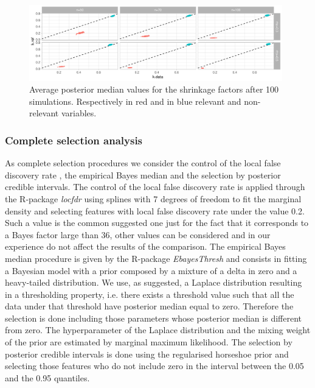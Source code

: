 \documentclass[american,]{article}
\theoremstyle{definition}
\begin{document}
\begin{figure}[tp]
  \centering
  \includegraphics[width=0.98\textwidth]{graphics/k.pdf}
  \caption{Average posterior median values for the shrinkage factors after 100 simulations. Respectively in red and in blue relevant and non-relevant variables.\\}
  \label{fig:k}
\end{figure}


\hypertarget{complete-selection}{%
\subsubsection{Complete selection analysis}\label{complete-selection}}
As complete selection procedures we consider the control of the local false discovery rate \citep{paper:efron, book:efron}, the empirical Bayes median \citep{paper:EBmed} and the selection by posterior credible intervals. The control of the local false discovery rate is applied through the R-package \textit{locfdr} using splines with 7 degrees of freedom to fit the marginal density and selecting features with local false discovery rate under the value 0.2. Such a value is the common suggested one just for the fact that it corresponds to a Bayes factor large than 36, other values can be considered and in our experience do not affect the results of the comparison. The empirical Bayes median procedure is given by the R-package \textit{EbayesThresh} and consists in fitting a Bayesian model with a prior composed by a mixture of a delta in zero and a heavy-tailed distribution. We use, as suggested, a Laplace distribution resulting in a thresholding property, i.e. there exists a threshold value such that all the data under that threshold have posterior median equal to zero. Therefore the selection is done including those parameters whose posterior median is different from zero. The hyperparameter of the Laplace distribution and the mixing weight of the prior are estimated by marginal maximum likelihood. The selection by posterior credible intervals is done using the regularised horseshoe prior and selecting those features who do not include zero in the interval between the 0.05 and the 0.95 quantiles.
\end{document}
